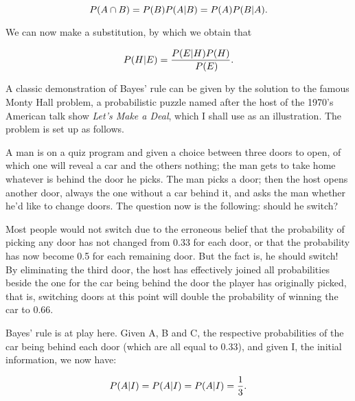 \begin{equation}
\\P(A \cap B) = \\P(B)\\P(A|B) = \\P(A)\\P(B|A).
\end{equation}

We can now make a substitution, by which we obtain that

\begin{equation}
\\P(H|E) = \frac{\\P(E|H)\\P(H)}{\\P(E)}.
\end{equation}

A classic demonstration of Bayes' rule can be given by the solution to the
famous Monty Hall problem, a probabilistic puzzle named after the host of the
1970's American talk show \textit{Let's Make a Deal}, which I shall use as an
illustration. The problem is set up as follows.

A man is on a quiz program and given a choice between three doors to open, of
which one will reveal a car and the others nothing; the man gets to take home
whatever is behind the door he picks. The man picks a door; then the host opens
another door, always the one without a car behind it, and asks the man whether
he'd like to change doors. The question now is the following: should he switch?

Most people would not switch due to the erroneous belief that the probability
of picking any door has not changed from 0.33 for each door, or that the
probability has now become 0.5 for each remaining door. But the fact is, he
should switch! By eliminating the third door, the host has effectively joined
all probabilities beside the one for the car being behind the door the player
has originally picked, that is, switching doors at this point will double the
probability of winning the car to 0.66.

Bayes' rule is at play here. Given A, B and C, the respective probabilities of
the car being behind each door (which are all equal to 0.33), and given I, the
initial information, we now have:

\begin{equation}
 \\P(A|I) = \\P(A|I) = \\P(A|I) = \frac{1}{3}.
\end{equation}

